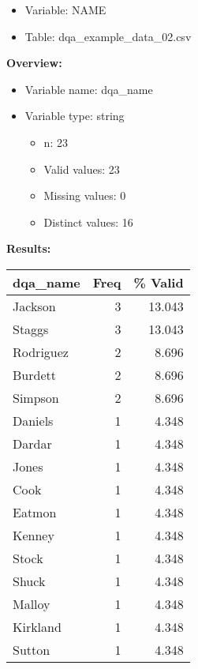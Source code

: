 \documentclass[
]{article}
\providecommand{\tightlist}{%
  \setlength{\itemsep}{0pt}\setlength{\parskip}{0pt}}
\begin{document}
\begin{itemize}
\tightlist
\item
  Variable: NAME
\item
  Table: dqa\_example\_data\_02.csv
\end{itemize}

\textbf{Overview:}

\begin{itemize}
\tightlist
\item
  Variable name: dqa\_name
\item
  Variable type: string

  \begin{itemize}
  \tightlist
  \item
    n: 23
  \item
    Valid values: 23
  \item
    Missing values: 0
  \item
    Distinct values: 16
  \end{itemize}
\end{itemize}

\textbf{Results:}\\

\begin{table}[H]
\centering
\begin{tabular}{l|r|r}
\hline
\textbf{dqa\_name} & \textbf{Freq} & \textbf{\% Valid}\\
\hline
Jackson & 3 & 13.043\\
\hline
Staggs & 3 & 13.043\\
\hline
Rodriguez & 2 & 8.696\\
\hline
Burdett & 2 & 8.696\\
\hline
Simpson & 2 & 8.696\\
\hline
Daniels & 1 & 4.348\\
\hline
Dardar & 1 & 4.348\\
\hline
Jones & 1 & 4.348\\
\hline
Cook & 1 & 4.348\\
\hline
Eatmon & 1 & 4.348\\
\hline
Kenney & 1 & 4.348\\
\hline
Stock & 1 & 4.348\\
\hline
Shuck & 1 & 4.348\\
\hline
Malloy & 1 & 4.348\\
\hline
Kirkland & 1 & 4.348\\
\hline
Sutton & 1 & 4.348\\
\hline
\end{tabular}
\end{table}
\newpage
\end{document}
